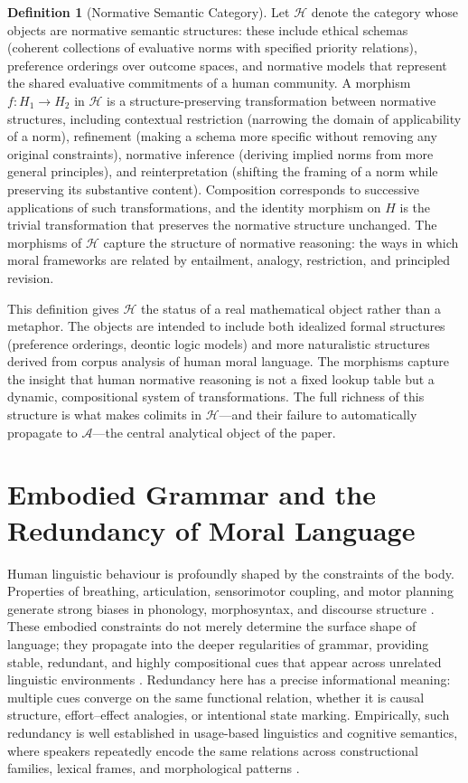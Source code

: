 \documentclass[12pt]{article}
\theoremstyle{definition}
\newtheorem{definition}[theorem]{Definition}
\begin{document}
\begin{definition}[Normative Semantic Category]
\label{def:H}
Let $\mathcal{H}$ denote the category whose objects are normative semantic
structures: these include ethical schemas (coherent collections of evaluative
norms with specified priority relations), preference orderings over outcome
spaces, and normative models that represent the shared evaluative commitments
of a human community. A morphism $f : H_1 \to H_2$ in $\mathcal{H}$ is a
structure-preserving transformation between normative structures, including
contextual restriction (narrowing the domain of applicability of a norm),
refinement (making a schema more specific without removing any original
constraints), normative inference (deriving implied norms from more general
principles), and reinterpretation (shifting the framing of a norm while
preserving its substantive content). Composition corresponds to successive
applications of such transformations, and the identity morphism on $H$ is the
trivial transformation that preserves the normative structure unchanged. The
morphisms of $\mathcal{H}$ capture the structure of normative reasoning: the
ways in which moral frameworks are related by entailment, analogy, restriction,
and principled revision.
\end{definition}

This definition gives $\mathcal{H}$ the status of a real mathematical object
rather than a metaphor. The objects are intended to include both idealized
formal structures (preference orderings, deontic logic models) and more
naturalistic structures derived from corpus analysis of human moral language.
The morphisms capture the insight that human normative reasoning is not a
fixed lookup table but a dynamic, compositional system of transformations. The
full richness of this structure is what makes colimits in $\mathcal{H}$---and
their failure to automatically propagate to $\mathcal{A}$---the central
analytical object of the paper.

\section{Embodied Grammar and the Redundancy of Moral Language}

Human linguistic behaviour is profoundly shaped by the constraints of the body.
Properties of breathing, articulation, sensorimotor coupling, and motor
planning generate strong biases in phonology, morphosyntax, and discourse
structure \citep{Bybee2010,Talmy2000,LakoffJohnson1980}. These embodied
constraints do not merely determine the surface shape of language; they
propagate into the deeper regularities of grammar, providing stable, redundant,
and highly compositional cues that appear across unrelated linguistic
environments \citep{Goldberg2006}. Redundancy here has a precise informational
meaning: multiple cues converge on the same functional relation, whether it is
causal structure, effort--effect analogies, or intentional state marking.
Empirically, such redundancy is well established in usage-based linguistics and
cognitive semantics, where speakers repeatedly encode the same relations across
constructional families, lexical frames, and morphological patterns
\citep{Bybee2010,Goldberg2006}.
\end{document}
